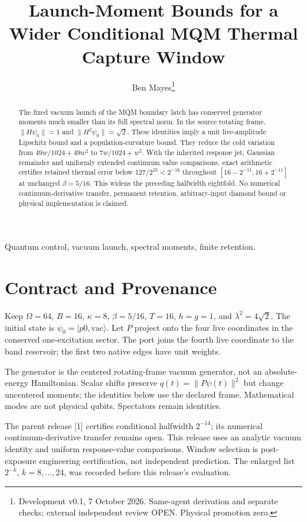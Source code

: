 \documentclass[a4paper,journal]{IEEEtran}
\begin{document}
\title{Launch-Moment Bounds for a Wider Conditional MQM Thermal Capture Window}
\author{Ben Mayes\thanks{Development v0.1, 7 October 2026. Same-agent derivation and separate checks; external independent review OPEN. Physical promotion zero.}}
\maketitle
\begin{abstract}
The fixed vacuum launch of the MQM boundary latch has conserved generator moments much smaller than its full spectral norm. In the source rotating frame, $\|H\psi_0\|=1$ and $\|H^2\psi_0\|=\sqrt2$. These identities imply a unit live-amplitude Lipschitz bound and a population-curvature bound. They reduce the cold variation from $49w/1024+49w^2$ to $7w/1024+w^2$. With the inherited response jet, Gaussian remainder and uniformly extended continuum value comparisons, exact arithmetic certifies retained thermal error below $127/2^{23}<2^{-16}$ throughout $[16-2^{-11},16+2^{-11}]$ at unchanged $\beta=5/16$. This widens the preceding halfwidth eightfold. No numerical continuum-derivative transfer, permanent retention, arbitrary-input diamond bound or physical implementation is claimed.
\end{abstract}
\begin{IEEEkeywords}Quantum control, vacuum launch, spectral moments, finite retention.\end{IEEEkeywords}
\section{Contract and Provenance}
Keep $\Omega=64$, $B=16$, $\kappa=8$, $\beta=5/16$, $T=16$, $h=g=1$, and $\lambda^2=4\sqrt2$. The initial state is $\psi_0=|p0,\mathrm{vac}\rangle$. Let $P$ project onto the four live coordinates in the conserved one-excitation sector. The port joins the fourth live coordinate to the band reservoir; the first two native edges have unit weights.

The generator is the centered rotating-frame vacuum generator, not an absolute-energy Hamiltonian. Scalar shifts preserve $q(t)=\|P\psi(t)\|^2$ but change uncentered moments; the identities below use the declared frame. Mathematical modes are not physical qubits. Spectators remain identities.

The parent release [1] certifies conditional halfwidth $2^{-14}$; its numerical continuum-derivative transfer remains open. This release uses an analytic vacuum identity and uniform response-value comparisons. Window selection is post-exposure engineering certification, not independent prediction. The enlarged list $2^{-k}$, $k=8,\ldots,24$, was recorded before this release's evaluation.
\end{document}
